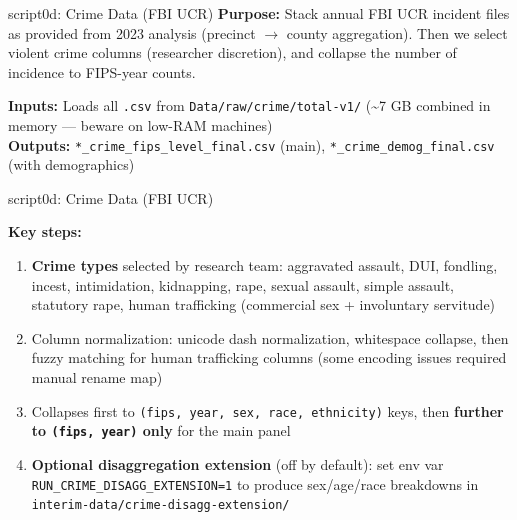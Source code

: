 \documentclass[aspectratio=169]{beamer}
\begin{document}
\begin{frame}{script0d: Crime Data (FBI UCR)}\label{0ad}
\textbf{Purpose:} Stack annual FBI UCR incident files as provided from 2023 analysis (precinct $\rightarrow$ county aggregation). Then we select violent crime columns (researcher discretion), and collapse the number of incidence to FIPS-year counts.

\vspace{0.3em}
\textbf{Inputs:} Loads all \texttt{.csv} from \texttt{Data/raw/crime/total-v1/} (\textasciitilde 7 GB combined in memory — beware on low-RAM machines)
\\
\vspace{0.3em}
\textbf{Outputs:} \texttt{*\_crime\_fips\_level\_final.csv} (main), \texttt{*\_crime\_demog\_final.csv} (with demographics)

\end{frame}


\begin{frame}{script0d: Crime Data (FBI UCR)}

\textbf{Key steps:}
\begin{enumerate}\small
    \item \textbf{Crime types} selected by research team: aggravated assault, DUI, fondling, incest, intimidation, kidnapping, rape, sexual assault, simple assault, statutory rape, human trafficking (commercial sex + involuntary servitude)
    \item Column normalization: unicode dash normalization, whitespace collapse, then fuzzy matching for human trafficking columns (some encoding issues required manual rename map)
    \item Collapses first to \texttt{(fips, year, sex, race, ethnicity)} keys, then \textbf{further to \texttt{(fips, year)} only} for the main panel
    \item \textbf{Optional disaggregation extension} (off by default): set env var \texttt{RUN\_CRIME\_DISAGG\_EXTENSION=1} to produce sex/age/race breakdowns in \texttt{interim-data/crime-disagg-extension/}
\end{enumerate}
\end{frame}
\end{document}
